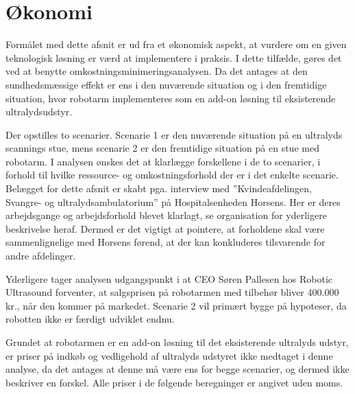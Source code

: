 \chapter{Økonomi} \label{Okonomi}
Formålet med dette afsnit er ud fra et økonomisk aspekt, at vurdere om en given teknologisk løsning er værd at implementere i praksis. I dette tilfælde, gøres det ved at benytte omkostningsminimeringsanalysen. Da det antages at den sundhedsmæssige effekt er ens i den nuværende situation og i den fremtidige situation, hvor robotarm implementeres som en add-on løsning til eksisterende ultralydsudstyr. 

Der opstilles to scenarier. Scenarie 1 er den nuværende situation på en ultralyds scannings stue, mens scenarie 2 er den fremtidige situation på en stue med robotarm. I analysen ønskes det at klarlægge forskellene i de to scenarier, i forhold til hvilke ressource- og omkostningsforhold der er i det enkelte scenarie. Belægget for dette afsnit er skabt pga. interview med ”Kvindeafdelingen, Svangre- og ultralydsambulatorium” på Hospitalsenheden Horsens. Her er deres arbejdsgange og arbejdsforhold blevet klarlagt, se organisation for yderligere beskrivelse heraf. Dermed er det vigtigt at pointere, at forholdene skal være sammenlignelige med Horsens førend, at der kan konkluderes tilsvarende for andre afdelinger. 

Yderligere tager analysen udgangspunkt i at CEO Søren Pallesen hos Robotic Ultrasound forventer, at salgsprisen på robotarmen med tilbehør bliver 400.000 kr., når den kommer på markedet. Scenarie 2 vil primært bygge på hypoteser, da robotten ikke er færdigt udviklet endnu. 

Grundet at robotarmen er en add-on løsning til det eksisterende ultralyds udstyr, er priser på indkøb og vedligehold af ultralyds udstyret ikke medtaget i denne analyse, da det antages at denne må være ens for begge scenarier, og dermed ikke beskriver en forskel. Alle priser i de følgende beregninger er angivet uden moms. 


